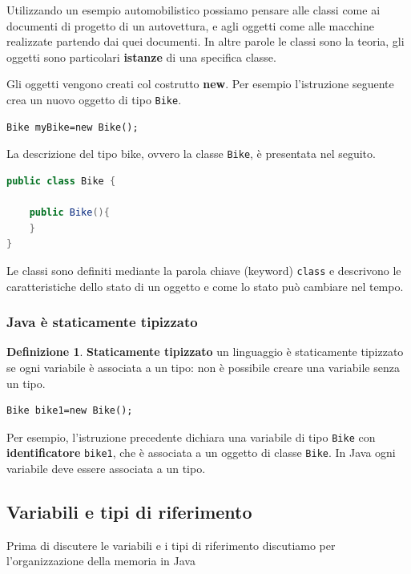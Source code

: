 \documentclass{article}
\theoremstyle{definition}
\newtheorem{mydef}{Definizione}
\begin{document}
Utilizzando un esempio automobilistico possiamo pensare alle classi come ai documenti di progetto di un autovettura, e agli oggetti come alle macchine realizzate partendo dai quei documenti. In altre parole le classi sono la teoria, gli oggetti sono particolari \textbf{istanze} di una specifica classe. 

Gli oggetti vengono creati col costrutto \textbf{new}. Per esempio l'istruzione seguente crea un nuovo oggetto di tipo \texttt{Bike}. 
\begin{lstlisting}
Bike myBike=new Bike();
\end{lstlisting}
La descrizione del tipo bike, ovvero la classe \texttt{Bike}, \`e presentata nel seguito.
\begin{lstlisting}[language=Java,escapechar=|]
public class Bike {

	public Bike(){
	}
}
\end{lstlisting}
Le classi sono definiti mediante la parola chiave (keyword) \texttt{class} e descrivono le caratteristiche dello stato di un oggetto e come lo stato pu\`o cambiare nel tempo.


\subsubsection{Java \`e staticamente tipizzato}
\begin{mydef} \textbf{Staticamente tipizzato} un linguaggio \`e staticamente tipizzato se ogni variabile \`e associata a un tipo: non \`e possibile creare una variabile senza un tipo.
\end{mydef}
\begin{lstlisting}
Bike bike1=new Bike();
\end{lstlisting}
Per esempio, l'istruzione precedente dichiara una variabile di tipo \texttt{Bike} con \textbf{identificatore} \texttt{bike1}, che \`e associata a un oggetto di classe \texttt{Bike}. 
In Java ogni variabile deve essere associata a un tipo.


\subsection{Variabili e tipi di riferimento}
Prima di discutere le variabili e i tipi di riferimento discutiamo per l'organizzazione della memoria in Java 
\end{document}
